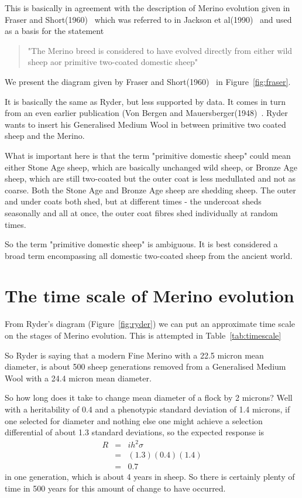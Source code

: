 \documentclass[titlepage]{article}  %
\begin{document}
This is basically in agreement with the description of Merino evolution given in Fraser and Short(1960)~\cite{fras:60} which was referred to in Jackson et al(1990)~\cite{jack:90} and used as a basis for the statement
\begin{quote}
"The Merino breed is considered to have evolved directly from either wild sheep aor primitive two-coated domestic sheep"
\end{quote}

We present the diagram given by Fraser and Short(1960)~\cite{fras:60} in Figure~\ref{fig:fraser}.


It is basically the same as Ryder, but less supported by data. It comes in turn from an even earlier publication (Von Bergen and Mauersberger(1948)~\cite{vonb:48}. Ryder wants to insert his Generalised Medium Wool in between primitive two coated sheep and the Merino.

What is important here is that the term "primitive domestic sheep" could mean either Stone Age sheep, which are basically unchanged wild sheep, or Bronze Age sheep, which are still two-coated but the outer coat is less medullated and not as coarse. Both the Stone Age and Bronze Age sheep are shedding sheep.   The outer and under coats both shed, but at different times - the undercoat sheds seasonally and all at once, the outer coat fibres shed individually at random times. 

So the term "primitive domestic sheep" is ambiguous.  It is best considered a broad term encompassing all domestic two-coated sheep from the ancient world.

\section{The time scale of Merino evolution}
From Ryder's diagram (Figure~\ref{fig:ryder}) we can put an approximate time scale on the stages of Merino evolution.  This is attempted in Table~\ref{tab:timescale}

So Ryder is saying that a modern Fine Merino  with a 22.5 micron mean diameter, is about 500 sheep generations removed from a Generalised Medium Wool with a 24.4 micron mean diameter. 

So how long does it take to change mean diameter of a flock by 2 microns? Well with a heritability of 0.4 and a phenotypic standard deviation of 1.4 microns, if one selected for diameter and nothing else one might achieve a selection differential of about 1.3 standard deviations, so the expected response is 
\begin{eqnarray*}
R & = & i h^{2} \sigma \\
  & = & (1.3) (0.4) (1.4) \\
  & = &  0.7
\end{eqnarray*}
 in one generation, which is about 4 years in sheep. So there is certainly plenty of time in 500 years for this amount of change to have occurred. 
\end{document}
